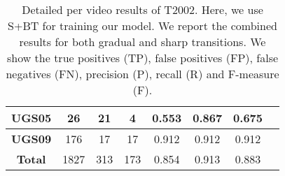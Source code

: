 \documentclass[journal]{IEEEtran}
\begin{document}
\begin{table}[h]
\begin{tabular}{|c|c|c|c|c|c|c|c|}
\textbf{UGS05}        & 26          & 21          & 4           & 0.553      & 0.867      & 0.675      \\ \hline
\textbf{UGS09}       & 176         & 17          & 17          & 0.912      & 0.912      & 0.912      \\ \hline
\textbf{Total}      & 1827        & 313         & 173         & 0.854      & 0.913      & 0.883      \\ \hline
\end{tabular}
\caption{Detailed per video results of T2002. Here, we use S+BT for training our model. We report the combined results for both gradual and sharp transitions. We show the true positives (TP), false positives (FP), false negatives (FN), precision (P), recall (R) and F-measure (F).}
\label{2002_01}
\end{table}
\end{document}
